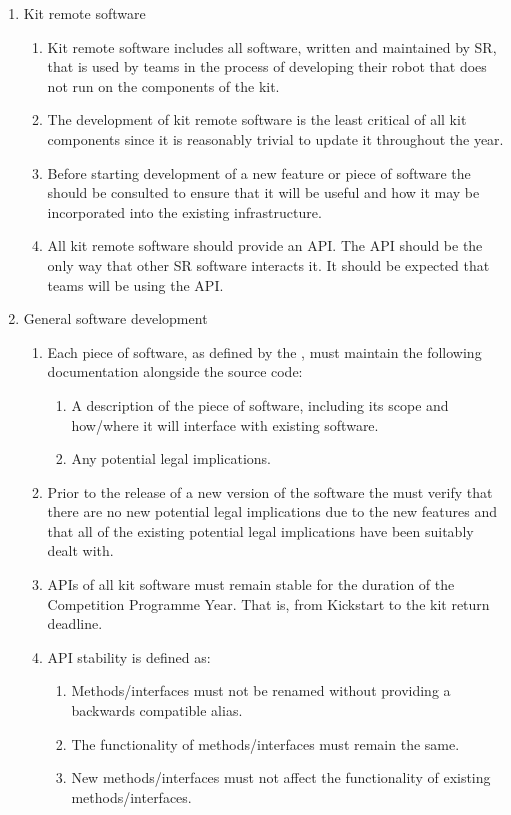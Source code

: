\begin{draft}
\begin{enumerate}
\begin{enumerate}
\begin{enumerate}
      \end{enumerate}
    \item Kit remote software
      \begin{enumerate}
        \item Kit remote software includes all software, written and maintained by SR, that is used by teams in the process of developing their robot that does not run on the components of the kit.
        \item The development of kit remote software is the least critical of all kit components since it is reasonably trivial to update it throughout the year.
        \item Before starting development of a new feature or piece of software the  should be consulted to ensure that it will be useful and how it may be incorporated into the existing infrastructure.
        \item All kit remote software should provide an API. The API should be the only way that other SR software interacts it. It should be expected that teams will be using the API.
      \end{enumerate}
    \item General software development
      \begin{enumerate}
        \item Each piece of software, as defined by the , must maintain the following documentation alongside the source code:
          \begin{enumerate}
            \item A description of the piece of software, including its scope and how/where it will interface with existing software.
            \item Any potential legal implications.
          \end{enumerate}
        \item Prior to the release of a new version of the software the  must verify that there are no new potential legal implications due to the new features and that all of the existing potential legal implications have been suitably dealt with.
        \item APIs of all kit software must remain stable for the duration of the Competition Programme Year. That is, from Kickstart to the kit return deadline.
        \item API stability is defined as:
          \begin{enumerate}
            \item Methods/interfaces must not be renamed without providing a backwards compatible alias.
            \item The functionality of methods/interfaces must remain the same.
            \item New methods/interfaces must not affect the functionality of existing methods/interfaces.
          \end{enumerate}
      \end{enumerate}
  \end{enumerate}


\end{enumerate}
\end{draft}
